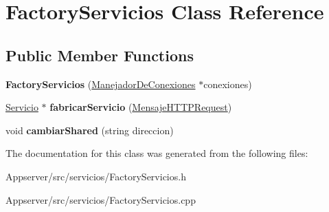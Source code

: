 \hypertarget{classFactoryServicios}{}\section{Factory\+Servicios Class Reference}
\label{classFactoryServicios}
\subsection*{Public Member Functions}
\begin{DoxyCompactItemize}
\item 
{\bfseries Factory\+Servicios} (\hyperlink{classManejadorDeConexiones}{Manejador\+De\+Conexiones} $\ast$conexiones)\hypertarget{classFactoryServicios_abb22835c51090de62025e2469704373c}{}\label{classFactoryServicios_abb22835c51090de62025e2469704373c}

\item 
\hyperlink{classServicio}{Servicio} $\ast$ {\bfseries fabricar\+Servicio} (\hyperlink{classMensajeHTTPRequest}{Mensaje\+H\+T\+T\+P\+Request})\hypertarget{classFactoryServicios_ab2cb5f05cf87a872852e25d230b6d735}{}\label{classFactoryServicios_ab2cb5f05cf87a872852e25d230b6d735}

\item 
void {\bfseries cambiar\+Shared} (string direccion)\hypertarget{classFactoryServicios_ae3035afd7f39d3fbaa9d0da11c1550da}{}\label{classFactoryServicios_ae3035afd7f39d3fbaa9d0da11c1550da}

\end{DoxyCompactItemize}


The documentation for this class was generated from the following files\+:\begin{DoxyCompactItemize}
\item 
Appserver/src/servicios/Factory\+Servicios.\+h\item 
Appserver/src/servicios/Factory\+Servicios.\+cpp\end{DoxyCompactItemize}
